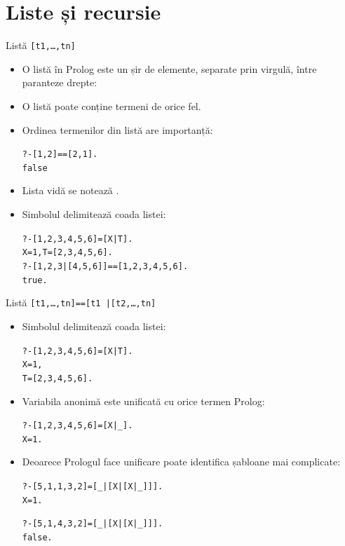\documentclass[xcolor=x11names,compress,10pt]{beamer}
\begin{document}
\section{Liste și recursie} \sectionframe
\begin{frame}{Listă \texttt{[t1,\ldots,tn]}}
\begin{itemize}
\item O listă în Prolog este un șir de elemente, separate prin virgulă, între paranteze drepte:

\begin{center}
\end{center}
\item O listă poate conține termeni de orice fel.
\item Ordinea termenilor din listă are importanță:
\begin{alltt}
?- [1,2] == [2,1] .\\
\alert{false}
\end{alltt}
\item Lista vidă se notează \intens{[$ \, $]}.
\item Simbolul \intens{$\mid$} delimitează coada listei:
\begin{alltt}
?- [1,2,3,4,5,6] = [X|T]. \\
X = 1, T = [2, 3, 4, 5, 6].\\
\medskip
?- [1,2,3|[4,5,6]] == [1,2,3,4,5,6].\\
true.
\end{alltt}
\end{itemize}
\end{frame}

\begin{frame}{Listă \texttt{[t1,\ldots,tn]==[t1 |[t2,\ldots,tn]}}
\begin{itemize}
\item Simbolul \intens{$\mid$} delimitează coada listei:
\begin{alltt}
?- [1,2,3,4,5,6] = [X|T]. \\
X = 1, \\
T = [2, 3, 4, 5, 6].
\end{alltt}

\item Variabila anonimă \intens{\texttt{\_}} este unificată cu orice termen Prolog:
\begin{alltt}
?- [1,2,3,4,5,6] = [X|\_]. \\
X = 1.
\end{alltt}

\item Deoarece Prologul face unificare poate identifica șabloane mai complicate: 
\begin{alltt}
?- [5,1,1,3,2]=[\_|[X|[X|\_]]].\\
X = 1.

?- [5,1,4,3,2]=[\_|[X|[X|\_]]].\\
false.
\end{alltt}
\end{itemize}
\end{frame}
\end{document}
